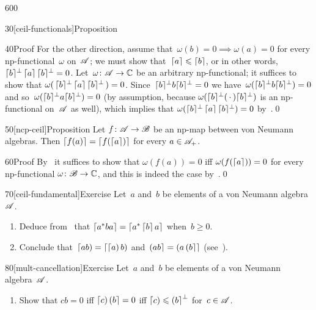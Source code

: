 \begin{parsec}{600}
\begin{point}{30}[ceil-functionals]{Proposition}
\begin{point}{40}{Proof}
For the other direction,
assume that~$\omega(b)=0\implies \omega(a)=0$
for every np-functional~$\omega$ on~$\mathscr{A}$;
we must show that~$\left\lceil a\right\rceil\leqslant \left\lceil b\right\rceil$,
or in other words, $\smash{\left\lceil b\right\rceil}^\perp \left\lceil a\right\rceil\smash{\left\lceil b\right\rceil}^\perp =0$.
Let~$\omega\colon \mathscr{A}\to\mathbb{C}$ be an arbitrary np-functional;
it suffices to show that 
$\omega(\,\smash{\left\lceil b\right\rceil}^\perp \left\lceil a\right\rceil\smash{\left\lceil b\right\rceil}^\perp \,)=0$.
Since~$\smash{\left\lceil b\right\rceil}^\perp b \smash{\left\lceil b\right\rceil}^\perp =0$
we have~$\omega(\smash{\left\lceil b\right\rceil}^\perp b\smash{\left\lceil b\right\rceil}^\perp)=0$
and so~$\omega(\smash{\left\lceil b\right\rceil}^\perp a \smash{\left\lceil b\right\rceil}^\perp)=0$
(by assumption, because
$\omega(\smash{\left\lceil b\right\rceil}^\perp(\,\cdot\,)\smash{\left\lceil b\right\rceil}^\perp)$
is an np-functional on~$\mathscr{A}$ as well),
which implies that
$\omega(\smash{\left\lceil b\right\rceil}^\perp\left\lceil a\right\rceil\smash{\left\lceil b\right\rceil}^\perp)=0$
by~.\qed
\end{point}
\end{point}
\begin{point}{50}[ncp-ceil]{Proposition}%
Let $f\colon \mathscr{A}\to\mathscr{B}$ be an np-map
between von Neumann algebras.
Then $\left\lceil f(a)\right\rceil=\left\lceil f(\left\lceil a\right\rceil)\right\rceil$
for every $a\in\mathscr{A}_+$.
\begin{point}{60}{Proof}%
By~
it suffices to show that
$\omega(f(a))=0$ iff $\omega(f(\left\lceil a\right\rceil))=0$
for every np-functional $\omega\colon \mathscr{B}\to\mathbb{C}$,
and this is indeed the case by~.\qed
\end{point}
\end{point}
\begin{point}{70}[ceil-fundamental]{Exercise}%
Let~$a$ and~$b$ be elements of a von Neumann algebra~$\mathscr{A}$.
\begin{enumerate}
\item
Deduce from~
that
$\left\lceil a^*ba\right\rceil = \left\lceil a^*\left\lceil b\right\rceil a\right\rceil$
when~$b\geq 0$.
\item
Conclude that~$\left\lceil ab\right)=\left\lceil\left\lceil a\right)b\right)$
and~$\left(ab\right\rceil=\left(a\left(b\right\rceil\right\rceil$
(see~).
\end{enumerate}
\spacingfix%
\end{point}%
\begin{point}{80}[mult-cancellation]{Exercise}%
Let~$a$ and~$b$ be elements of a von Neumann algebra~$\mathscr{A}$.
\begin{enumerate}
\item
Show that $cb=0$ iff $\left\lceil c\right)\left(b\right\rceil=0$
iff $\left\lceil c\right)\leqslant \left(b\right\rceil^\perp$
for~$c\in\mathscr{A}$.


\end{enumerate}
\end{point}
\end{parsec}
